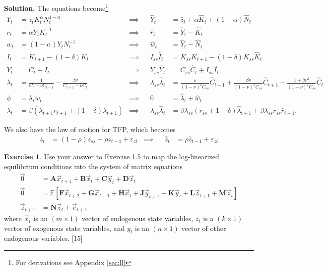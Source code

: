 \documentclass[11pt]{article}
\numberwithin{equation}{section} %
\numberwithin{figure}{section} %
\numberwithin{table}{section} %
\theoremstyle{definition}
\newtheorem{exercise}[theorem]{Exercise}
\newenvironment{solution}{\begin{addmargin}[2em]{0em} {\bf Solution. }}{\end{addmargin}}
\begin{document}
\begin{solution}
    The equations become\footnote{For derivations see Appendix \ref{sec:ll}}
    \begin{align*}
        Y_t &= z_t K_t^\alpha N_t^{1-\alpha} &\implies&& \hat{Y}_t &= \hat{z}_t + \alpha \hat{K}_t + (1-\alpha) \hat{N}_t \\
        r_t &= \alpha Y_t K_t^{-1} &\implies&& \hat{r}_t &= \hat{Y}_t - \hat{K}_t \\
        w_t &= (1 - \alpha) Y_t N_t^{-1} &\implies&& \hat{w}_t &= \hat{Y}_t - \hat{N}_t \\
        I_t &= K_{t + 1} - (1 - \delta) K_t &\implies&& I_{ss} \hat{I}_t &= K_{ss} \hat{K}_{t + 1} - (1 - \delta) K_{ss} \hat{K}_t \\
        Y_t &= C_t + I_t &\implies&& Y_{ss} \hat{Y}_t &= C_{ss} \hat{C}_t + I_{ss} \hat{I}_t \\
        \lambda_t &= \frac{1}{C_t - \nu C_{t-1}} - \frac{\beta \nu}{C_{t+1} - \nu C_t} &\implies&& \lambda_{ss} \hat{\lambda}_t &= \frac{\nu}{(1 - \nu)^2 C_{ss}} \hat{C}_{t-1} + \frac{\beta \nu}{(1 - \nu)^2 C_{ss}} \hat{C}_{t+1} - \frac{1 + \beta \nu^2}{(1 - \nu)^2 C_{ss}} \hat{C}_t \\
        \phi &= \lambda_t w_t &\implies&& 0 &= \hat{\lambda}_t + \hat{w}_t \\
        \lambda_t &= \beta(\lambda_{t+1} r_{t+1} + (1-\delta) \lambda_{t+1}) &\implies&& \lambda_{ss} \hat{\lambda}_t &= \beta \lambda_{ss} (r_{ss} + 1 - \delta) \hat{\lambda}_{t+1} + \beta \lambda_{ss} r_{ss} \hat{r}_{t+1}.
    \end{align*} 

    We also have the law of motion for TFP, which becomes
    \begin{align*}
        z_t &= (1-\rho)z_{ss} + \rho z_{t-1} + \varepsilon_{zt} &\implies&& \hat{z}_t &= \rho \hat{z}_{t-1} + \varepsilon_{zt}
    \end{align*}
\end{solution}


\begin{exercise}
    Use your answer to Exercise 1.5 to map the log-linearized equilibrium conditions into the system of matrix equations
    \begin{align*}
        \vec{0} &= \mathbf{A} \vec{x}_{t+1} + \mathbf{B} \vec{x}_t + \mathbf{C} \vec{y}_t + \mathbf{D} \vec{z}_t \\
        \vec 0 &= \mathbb{E} \left[ \mathbf{F} \vec{x}_{t+2} + \mathbf{G} \vec{x}_{t+1} + \mathbf{H} \vec{x}_t + \mathbf{J} \vec{y}_{t+1} + \mathbf{K} \vec{y}_t + \mathbf{L} \vec{z}_{t+1} + \mathbf{M} \vec{z}_t \right] \\
        \vec{z}_{t+1} &= \mathbf{N} \vec{z}_t + \vec{e}_{t+1}
    \end{align*}
    where $\vec{x}_t$ is an $(m \times 1)$ vector of endogenous state variables, $z_t$ is a $(k \times 1)$ vector of exogenous state variables, and $y_t$ is an $(n \times 1)$ vector of other endogenous variables. [15]
\end{exercise}
\end{document}
